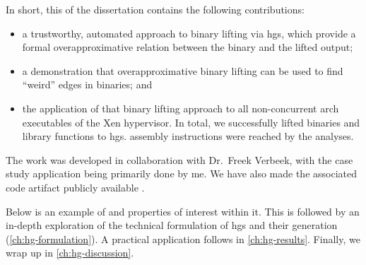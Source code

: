 In short, this  of the dissertation contains the following contributions:
\begin{itemize}
  \item a trustworthy, automated approach to binary lifting via \acp{hg}, which provide a formal overapproximative relation between the binary and the lifted output;
  \item a demonstration that overapproximative binary lifting can be used to find ``weird'' edges in binaries; and
  \item the application of that binary lifting approach to all non-concurrent \gls{arch} executables of the Xen hypervisor.
  In total, we successfully lifted  binaries and  library functions to \acp{hg}.
  assembly instructions were reached by the analyses.
\end{itemize}
The work was developed in collaboration with Dr.~Freek Verbeek, with the case study application being primarily done by me.
We have also made the associated code artifact publicly available \autocite{bockenek2022artifact}.

Below is an example of  and properties of interest within it.
This  is followed by an in-depth exploration of the technical formulation of \acp{hg} and their generation (\cref{ch:hg-formulation}).
A practical application follows in \cref{ch:hg-results}.
Finally, we wrap up in \cref{ch:hg-discussion}.

